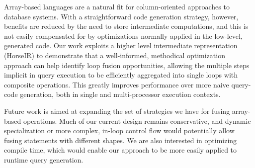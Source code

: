 Array-based languages are a natural fit for column-oriented approaches to database systems.  With a straightforward code generation strategy, however, benefits are reduced by the need to store intermediate computations, and this is not easily compensated for by optimizations normally applied in the low-level, generated code.  Our work exploits a higher level intermediate representation (HorseIR) to demonstrate that a well-informed, methodical optimization approach can help identify loop fusion opportunities, allowing the multiple steps implicit in query execution to be efficiently aggregated into single loops with composite operations.  This greatly improves performance over more naive query-code generation, both in single and multi-processor execution contexts.

Future work is aimed at expanding the set of strategies we have for fusing array-based operations.  Much of our current design remains conservative, and dynamic specialization or more complex, in-loop control flow would potentially allow fusing statements with different shapes.  We are also interested in optimizing compile time, which would enable our approach to be more easily applied to runtime query generation.
